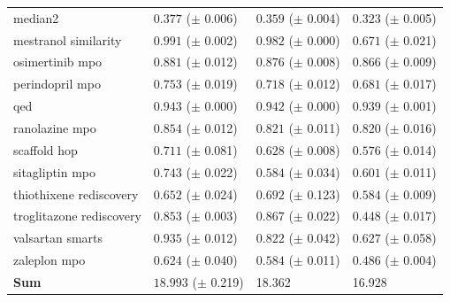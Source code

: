 \documentclass{article} %
\begin{document}
\begin{table}[ht]
\begin{tabularx}{\linewidth}{l|>{}p{2.2cm} Y Y }
\small{median2} & $\mathbf{0.377}$ {\tiny ($\pm$ 0.006)} & $0.359$ {\tiny ($\pm$ 0.004)} & $0.323$ {\tiny ($\pm$ 0.005)} \\
\small{mestranol similarity} & $\mathbf{0.991}$ {\tiny ($\pm$ 0.002)} & $0.982$ {\tiny ($\pm$ 0.000)} & $0.671$ {\tiny ($\pm$ 0.021)} \\
\small{osimertinib mpo} & $\mathbf{0.881}$ {\tiny ($\pm$ 0.012)} & $\mathbf{0.876}$ {\tiny ($\pm$ 0.008)} & $0.866$ {\tiny ($\pm$ 0.009)} \\
\small{perindopril mpo} & $\mathbf{0.753}$ {\tiny ($\pm$ 0.019)} & $0.718$ {\tiny ($\pm$ 0.012)} & $0.681$ {\tiny ($\pm$ 0.017)} \\
\small{qed} & $\mathbf{0.943}$ {\tiny ($\pm$ 0.000)} & $0.942$ {\tiny ($\pm$ 0.000)} & $0.939$ {\tiny ($\pm$ 0.001)} \\
\small{ranolazine mpo} & $\mathbf{0.854}$ {\tiny ($\pm$ 0.012)} & $0.821$ {\tiny ($\pm$ 0.011)} & $0.820$ {\tiny ($\pm$ 0.016)} \\
\small{scaffold hop} & $\mathbf{0.711}$ {\tiny ($\pm$ 0.081)} & $0.628$ {\tiny ($\pm$ 0.008)} & $0.576$ {\tiny ($\pm$ 0.014)} \\
\small{sitagliptin mpo} & $\mathbf{0.743}$ {\tiny ($\pm$ 0.022)} & $0.584$ {\tiny ($\pm$ 0.034)} & $0.601$ {\tiny ($\pm$ 0.011)} \\
\small{thiothixene rediscovery} & $\mathbf{0.652}$ {\tiny ($\pm$ 0.024)} & $\mathbf{0.692}$ {\tiny ($\pm$ 0.123)} & $\mathbf{0.584}$ {\tiny ($\pm$ 0.009)} \\
\small{troglitazone rediscovery} & $\mathbf{0.853}$ {\tiny ($\pm$ 0.003)} & $\mathbf{0.867}$ {\tiny ($\pm$ 0.022)} & $0.448$ {\tiny ($\pm$ 0.017)} \\
\small{valsartan smarts} & $\mathbf{0.935}$ {\tiny ($\pm$ 0.012)} & $0.822$ {\tiny ($\pm$ 0.042)} & $0.627$ {\tiny ($\pm$ 0.058)} \\
\small{zaleplon mpo} & $\mathbf{0.624}$ {\tiny ($\pm$ 0.040)} & $\mathbf{0.584}$ {\tiny ($\pm$ 0.011)} & $0.486$ {\tiny ($\pm$ 0.004)} \\
\midrule
\textbf{Sum} & $\mathbf{18.993}$ {\tiny ($\pm$ 0.219)} & 18.362 & 16.928 \\
\bottomrule
\end{tabularx}
\end{table}
\end{document}
